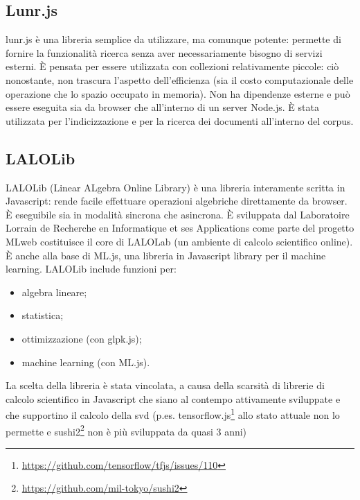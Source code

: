 \subsection{Lunr.js}
lunr.js è una libreria semplice da utilizzare, ma comunque potente: permette di fornire la funzionalità ricerca senza aver necessariamente bisogno di servizi esterni. 
È pensata per essere utilizzata con collezioni relativamente piccole: ciò nonostante, non trascura l'aspetto dell'efficienza (sia il costo computazionale delle operazione che lo spazio occupato in memoria). 
Non ha dipendenze esterne e può essere eseguita sia da browser che all'interno di un server Node.js.
È stata utilizzata per l'indicizzazione e per la ricerca dei documenti all'interno del \gls{corpus}.

\FloatBarrier

\subsection{LALOLib}
LALOLib (Linear ALgebra Online Library) è una libreria interamente scritta in Javascript: rende facile effettuare operazioni algebriche direttamente da browser. È eseguibile sia in modalità sincrona che asincrona. È sviluppata dal Laboratoire Lorrain de Recherche en Informatique et ses Applications come parte del progetto MLweb costituisce il core di LALOLab (un ambiente di calcolo scientifico online). È anche alla base di ML.js, una libreria in Javascript library per il machine learning. 
LALOLib include funzioni per:
\begin{itemize}
    \item algebra lineare;
    \item statistica;
    \item ottimizzazione (con glpk.js);
    \item machine learning (con ML.js).
\end{itemize}

La scelta della libreria è stata vincolata, a causa della scarsità di librerie di calcolo scientifico in Javascript che siano al contempo attivamente sviluppate e che supportino il calcolo della \gls{svd} (p.es. tensorflow.js\footnote{\url{https://github.com/tensorflow/tfjs/issues/110}} allo stato attuale non lo permette e sushi2\footnote{\url{https://github.com/mil-tokyo/sushi2}} non è più sviluppata da quasi 3 anni) 

